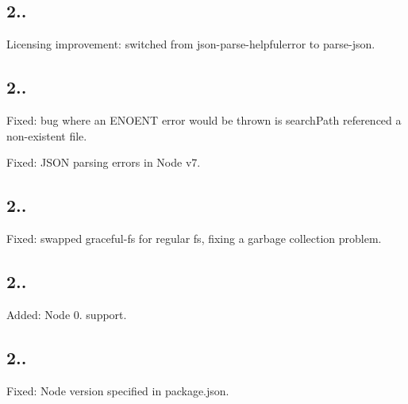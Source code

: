 \subsection*{2..}


\begin{DoxyItemize}
\item Licensing improvement\+: switched from {\ttfamily json-\/parse-\/helpfulerror} to {\ttfamily parse-\/json}.
\end{DoxyItemize}

\subsection*{2..}


\begin{DoxyItemize}
\item Fixed\+: bug where an {\ttfamily E\+N\+O\+E\+NT} error would be thrown is {\ttfamily search\+Path} referenced a non-\/existent file.
\item Fixed\+: J\+S\+ON parsing errors in Node v7.
\end{DoxyItemize}

\subsection*{2..}


\begin{DoxyItemize}
\item Fixed\+: swapped {\ttfamily graceful-\/fs} for regular {\ttfamily fs}, fixing a garbage collection problem.
\end{DoxyItemize}

\subsection*{2..}


\begin{DoxyItemize}
\item Added\+: Node 0. support.
\end{DoxyItemize}

\subsection*{2..}


\begin{DoxyItemize}
\item Fixed\+: Node version specified in {\ttfamily package.\+json}.
\end{DoxyItemize}

